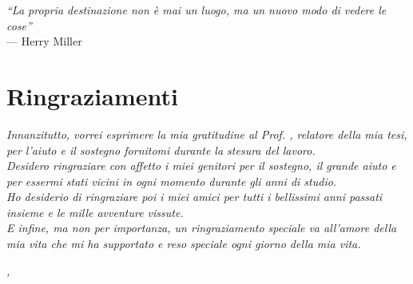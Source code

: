\cleardoublepage
{}
{}

\begin{flushright}{
    \slshape
    ``La propria destinazione non è mai un luogo, ma un nuovo modo di vedere le cose''} \\
    \medskip
    --- Herry Miller
\end{flushright}


\bigskip

\begingroup
\let\clearpage\relax
\let\cleardoublepage\relax
\let\cleardoublepage\relax

\chapter*{Ringraziamenti}

\noindent \textit{Innanzitutto, vorrei esprimere la mia gratitudine al Prof. \myProf, relatore della mia tesi, per l'aiuto e il sostegno fornitomi durante la stesura del lavoro.}\\

\noindent \textit{Desidero ringraziare con affetto i miei genitori per il sostegno, il grande aiuto e per essermi stati vicini in ogni momento durante gli anni di studio.}\\

\noindent \textit{Ho desiderio di ringraziare poi i miei amici per tutti i bellissimi anni passati insieme e le mille avventure vissute.}\\

\noindent \textit{E infine, ma non per importanza, un ringraziamento speciale va all'amore della mia vita che mi ha supportato e reso speciale ogni giorno della mia vita.}\\
\bigskip

\noindent\textit{\myLocation, \myTime}
\hfill \myName

\endgroup
